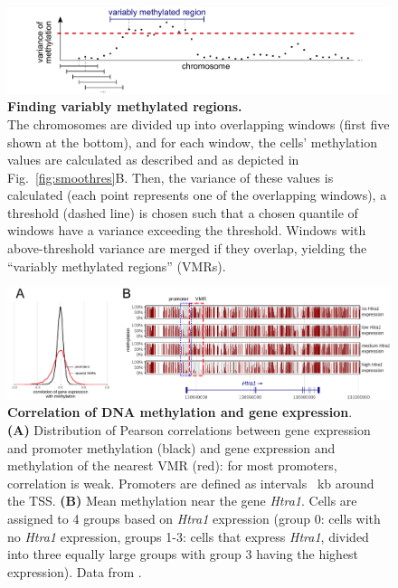 \documentclass[10pt]{article}
\begin{document}
\begin{figure}[p]
	\begin{center}
		\includegraphics[width=.7\columnwidth]{figures/Fig_sliding.pdf}
	\end{center}
	\caption{\small \textbf{Finding variably methylated regions.}\\
		The chromosomes are divided up into overlapping windows (first five shown at the bottom), and for each window, the cells' methylation values are calculated as described and as depicted in Fig.~\ref{fig:smoothres}B.
		Then, the variance of these values is calculated (each point represents one of the overlapping windows), a threshold (dashed line) is chosen such that a chosen quantile of windows have a variance exceeding the threshold.
		Windows with above-threshold variance are merged if they overlap, yielding the ``variably methylated regions'' (VMRs).}
	\label{fig:vmr}
\end{figure}


\begin{figure}[p]
	\begin{center}
		\includegraphics[width=\textwidth]{figures/Fig_correlation.pdf}
	\end{center}
	\caption{\small \textbf{Correlation of DNA methylation and gene expression}.\\
		\textbf{(A)} Distribution of Pearson correlations between gene expression and promoter methylation (black) and gene expression and methylation of the nearest VMR (red): for most promoters, correlation is weak.
		Promoters are defined as intervals ~kb around the TSS.
		\textbf{(B)} Mean methylation near the gene \textit{Htra1}.
		Cells are assigned to 4 groups based on \textit{Htra1} expression (group 0: cells with no \textit{Htra1} expression, groups 1-3: cells that express \textit{Htra1}, divided into three equally large groups with group 3 having the highest expression).
		Data from \citet{kremer_scnmt}.}
	\label{fig:correlation}
\end{figure}
\end{document}
